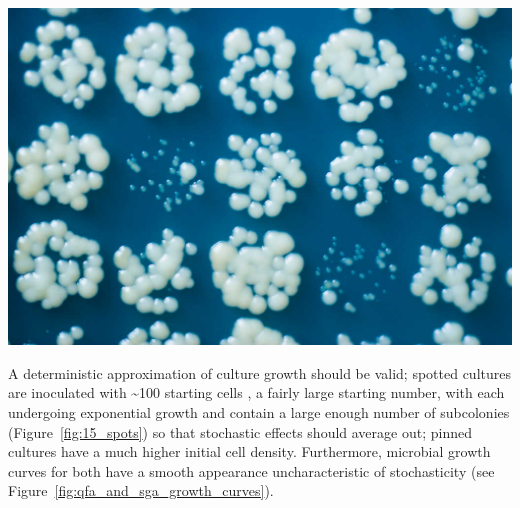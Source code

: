 \begin{multicols}{2}
\begin{Figure}
  \centering
  \includegraphics[width=\linewidth]{5658435523_c2e43729f1_b}
  \label{fig:15_spots}
\end{Figure}

A deterministic approximation of culture growth should be valid; spotted cultures are
inoculated with \textasciitilde 100 starting cells \citep{Addinall2011}, a fairly large
starting number, with each undergoing exponential growth and contain a large enough number
of subcolonies (Figure~\ref{fig:15_spots}) so that stochastic effects should average out;
pinned cultures have a much higher initial cell density. Furthermore, microbial growth
curves for both have a smooth appearance uncharacteristic of stochasticity (see
Figure~\ref{fig:qfa_and_sga_growth_curves}).


\end{multicols}
